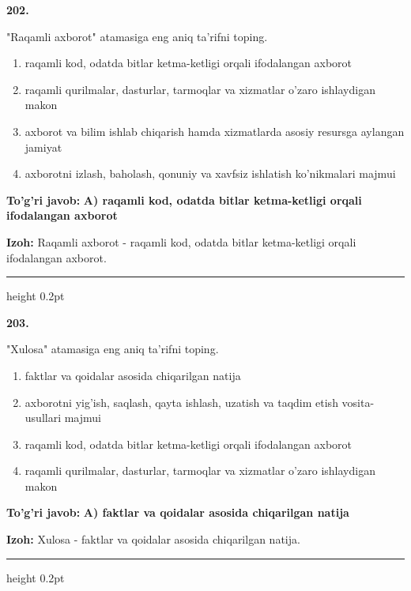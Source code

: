 \documentclass[10pt,a4paper,oneside]{article}
\begin{document}
\noindent\textbf{\color{ink}202.}
\par
"Raqamli axborot" atamasiga eng aniq ta'rifni toping.
\begin{enumerate}[label=\Alph*),leftmargin=9mm]
\item raqamli kod, odatda bitlar ketma-ketligi orqali ifodalangan axborot
\item raqamli qurilmalar, dasturlar, tarmoqlar va xizmatlar o'zaro ishlaydigan makon
\item axborot va bilim ishlab chiqarish hamda xizmatlarda asosiy resursga aylangan jamiyat
\item axborotni izlash, baholash, qonuniy va xavfsiz ishlatish ko'nikmalari majmui
\end{enumerate}
\begin{tcolorbox}[enhanced,breakable,colback=teal!4,colframe=teal!50!black,boxrule=0.5pt,arc=1.1mm,left=3mm,right=3mm,top=1.7mm,bottom=1.7mm,before skip=2mm,after skip=2mm]
\textbf{\color{teal}To'g'ri javob:} \textbf{A) raqamli kod, odatda bitlar ketma-ketligi orqali ifodalangan axborot}
\par\smallskip
\textbf{Izoh:} Raqamli axborot - raqamli kod, odatda bitlar ketma-ketligi orqali ifodalangan axborot.
\end{tcolorbox}
\vspace{2mm}\hrule height 0.2pt \vspace{3mm}

\noindent\textbf{\color{ink}203.}
\par
"Xulosa" atamasiga eng aniq ta'rifni toping.
\begin{enumerate}[label=\Alph*),leftmargin=9mm]
\item faktlar va qoidalar asosida chiqarilgan natija
\item axborotni yig'ish, saqlash, qayta ishlash, uzatish va taqdim etish vosita-usullari majmui
\item raqamli kod, odatda bitlar ketma-ketligi orqali ifodalangan axborot
\item raqamli qurilmalar, dasturlar, tarmoqlar va xizmatlar o'zaro ishlaydigan makon
\end{enumerate}
\begin{tcolorbox}[enhanced,breakable,colback=teal!4,colframe=teal!50!black,boxrule=0.5pt,arc=1.1mm,left=3mm,right=3mm,top=1.7mm,bottom=1.7mm,before skip=2mm,after skip=2mm]
\textbf{\color{teal}To'g'ri javob:} \textbf{A) faktlar va qoidalar asosida chiqarilgan natija}
\par\smallskip
\textbf{Izoh:} Xulosa - faktlar va qoidalar asosida chiqarilgan natija.
\end{tcolorbox}
\vspace{2mm}\hrule height 0.2pt \vspace{3mm}
\end{document}
